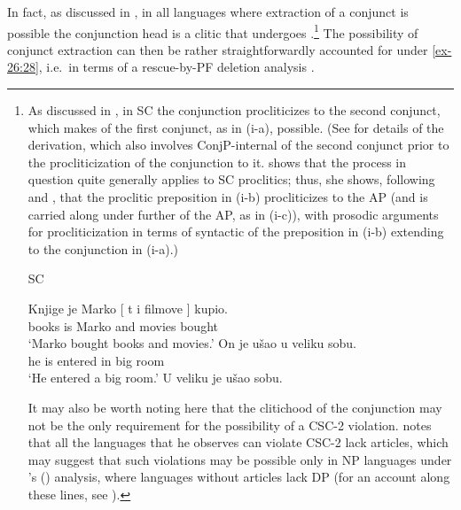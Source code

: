 \documentclass[output=paper]{langsci/langscibook}
\begin{document}
In fact, as discussed in \textcite{Oda:2017}, in all languages where extraction
of a conjunct is possible the conjunction head is a clitic that
undergoes .\footnote{As discussed in \textcite{Stjepanovic2014},
    in \gls{SC} the conjunction procliticizes to the second
    conjunct, which makes  of the first conjunct, as in (i-a),
    possible. (See \citealt{Stjepanovic2014} for details of the derivation,
    which also involves ConjP-internal  of the second conjunct
    prior to the procliticization of the conjunction to it.
    \citeauthor{Stjepanovic2014} shows that the process in question quite
    generally applies to \gls{SC} proclitics; thus, she shows,
    following \citealt{Boskovic2013b} and \citealt{Talic2014}, that the
    proclitic preposition in (i-b) procliticizes to the AP (and is
    carried along under further  of the AP, as in (i-c)), with
     prosodic arguments for procliticization in
    terms of syntactic  of the preposition in (i-b) extending to
    the conjunction in (i-a).)

\begin{exe}
 \glsdesc{SC}
    \begin{xlist}
	\ex\gll {}Knjige je Marko [ t i filmove ] kupio.\\
            books is Marko {} {} and movies {} bought\\
	\glt    \enquote*{Marko bought books and movies.}
	\ex\gll On  je  ušao  u  veliku  sobu.\\
			he is entered in big room\\
	\glt \enquote*{He entered a big room.}
	\ex U veliku je ušao sobu.
    \end{xlist}
\end{exe}

It may also be worth noting here that the clitichood of the conjunction may not
be the only requirement for the possibility of a CSC-2 violation.
\citeauthor{Oda:2017} notes that all the languages that he observes can
violate CSC-2 lack articles, which may suggest that such violations may be
possible only in NP languages under \citeauthor{Boskovic2008}’s
(\citeyear{Boskovic2008,Boskovic2012}) analysis, where languages without
articles lack DP (for an account along these lines, see
\citealt{Boskovic2017}).\label{fn:24}} The possibility of conjunct extraction
can then be rather straightforwardly accounted for under \eqref{ex-26:28}, i.e.\ in terms
of a rescue-by-\gls{PF} deletion analysis
\parencite[see][]{Oda:2017,Stjepanovic2014}.
\end{document}
